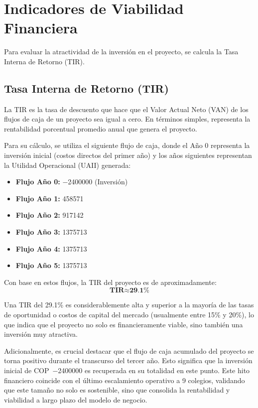 \section{Indicadores de Viabilidad Financiera}

Para evaluar la atractividad de la inversión en el proyecto, se calcula la
Tasa Interna de Retorno (TIR).

\subsection{Tasa Interna de Retorno (TIR)}

La TIR es la tasa de descuento que hace que el Valor Actual Neto (VAN) de los
flujos de caja de un proyecto sea igual a cero. En términos simples,
representa la rentabilidad porcentual promedio anual que genera el proyecto.

Para su cálculo, se utiliza el siguiente flujo de caja, donde el Año 0
representa la inversión inicial (costos directos del primer año) y los años
siguientes representan la Utilidad Operacional (UAII) generada:

\begin{itemize}
    \item \textbf{Flujo Año 0:} \num{-2400000} (Inversión)
    \item \textbf{Flujo Año 1:} \num{458571}
    \item \textbf{Flujo Año 2:} \num{917142}
    \item \textbf{Flujo Año 3:} \num{1375713}
    \item \textbf{Flujo Año 4:} \num{1375713}
    \item \textbf{Flujo Año 5:} \num{1375713}
\end{itemize}

Con base en estos flujos, la TIR del proyecto es de aproximadamente:
\[ \textbf{TIR} \approx \textbf{29.1\%} \]

Una TIR del 29.1\% es considerablemente alta y superior a la mayoría de las
tasas de oportunidad o costos de capital del mercado (usualmente entre 15\% y
20\%), lo que indica que el proyecto no solo es financieramente viable, sino
también una inversión muy atractiva.

Adicionalmente, es crucial destacar que el flujo de caja acumulado del
proyecto se torna positivo durante el transcurso del tercer año. Esto
significa que la inversión inicial de \mbox{COP \num{-2400000}} es recuperada
en su totalidad en este punto. Este hito financiero coincide con el último
escalamiento operativo a 9 colegios, validando que este tamaño no solo es
sostenible, sino que consolida la rentabilidad y viabilidad a largo plazo
del modelo de negocio.
